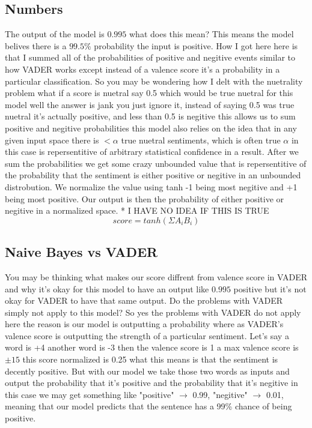\documentclass[12pt]{article}
\begin{document}
\subsection{Numbers}
The output of the model is $0.995$ what does this mean? This means the model belives there is a $99.5\%$ probability the input is
positive. How I got here here is that I summed all of the probabilities of positive and negitive events similar to how VADER works except
instead of a valence score it's a probability in a particular classification. So you may be wondering how I delt with the nuetrality problem
what if a score is nuetral say 0.5 which would be true nuetral for this model well the answer is jank you just ignore it, instead of saying
0.5 was true nuetral it's actually positive, and less than 0.5 is negitive this allows us to sum positive and negitive probabilities
this model also relies on the idea that in any given input space there is $<\alpha$ true nuetral sentiments, which is often true $\alpha$ in
this case is repersentitive of arbitrary statistical confidence in a result. After we sum the probabilities we get some crazy unbounded value
that is repersentitive of the probability that the sentiment is either positive or negitive in an unbounded distrobution. We normalize the value
using tanh -1 being most negitive and +1 being most positive. Our output is then the probability of either
positive or negitive in a normalized space. * I HAVE NO IDEA IF THIS IS TRUE
$$
score = tanh(\Sigma{}A_i B_i)
$$

\subsection{Naive Bayes vs VADER}
You may be thinking what makes our score diffrent from valence score in VADER and why it's okay for this model to have
an output like $0.995$ positive but it's not okay for VADER to have that same output. Do the problems with VADER simply
not apply to this model? So yes the problems with VADER do not apply here the reason is our model is outputting a probability
where as VADER's valence score is outputting the strength of a particular sentiment. Let's say a word is +4 another word is -3
then the valence score is 1 a max valence score is $\pm15$ this score normalized is 0.25 what this means is that the sentiment 
is decently positive. But with our model we take those two words as inputs and output the probability that it's positive and the
probability that it's negitive in this case we may get something like "positive" $\rightarrow$ 0.99, "negitive" $\rightarrow$ 0.01, meaning that our
model predicts that the sentence has a 99\% chance of being positive.
\end{document}
